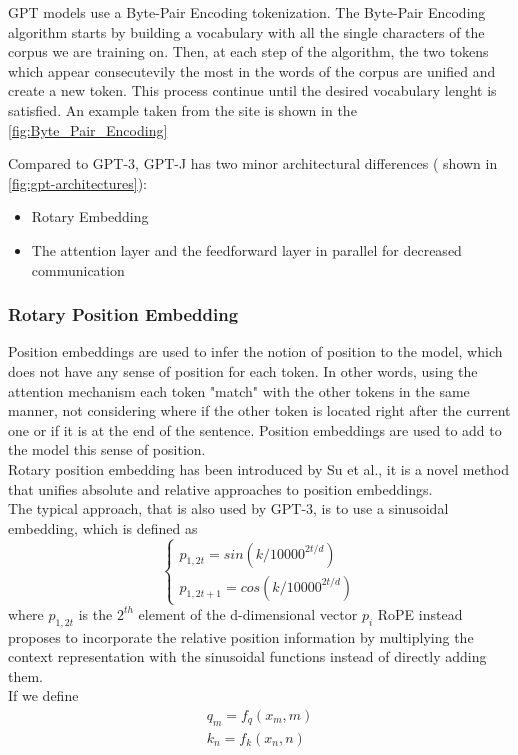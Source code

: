 GPT models use a Byte-Pair Encoding tokenization. The Byte-Pair Encoding algorithm starts by building a vocabulary with all the single characters of the corpus we are training on. Then, at each step of the algorithm, the two tokens which appear consecutevily the most in the words of the corpus are unified and create a new token. This process continue until the desired vocabulary lenght is satisfied. An example taken from the site \cite{byte-pair-encoding} is shown in the \autoref{fig:Byte_Pair_Encoding}


Compared to GPT-3, GPT-J\cite{gptj} has two minor architectural differences  ( shown in \autoref{fig:gpt-architectures}):
\begin{itemize}
    \item Rotary Embedding
    \item The attention layer and the feedforward layer in parallel for decreased communication
\end{itemize}

\subsubsection{Rotary Position Embedding}
Position embeddings are used to infer the notion of position to the model, which does not have any sense of position for each token. In other words, using the attention mechanism each token "match" with the other tokens in the same manner, not considering where if the other token is located right after the current one or if it is at the end of the sentence. Position embeddings are used to add to the model this sense of position. \\ Rotary position embedding has been introduced by Su et al.\cite{su2021roformer}, it is a novel method that unifies absolute and relative approaches to position embeddings. \\
The typical approach, that is also used by GPT-3, is to use a sinusoidal embedding, which is defined as
\begin{equation*}
    \begin{cases}
        p_{1,2t} = sin(k/10000^{2t/d}) \\
        p_{1,2t+1} = cos(k/10000^{2t/d}) 
    \end{cases}
\end{equation*}
where $p_{1,2t}$ is the $2^{th}$ element of the d-dimensional vector $p_i$
RoPE instead proposes to incorporate the relative position information by multiplying the context representation with the sinusoidal functions instead of directly adding them. \\
If we define 
\begin{equation*}
    \begin{split}
        q_m = f_q(x_m, m) \\
        k_n = f_k(x_n, n) 
    \end{split}    
\end{equation*}

